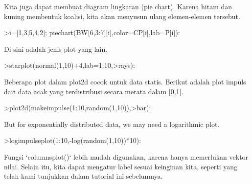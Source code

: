 \documentclass[a4paper,10pt]{article}
\begin{document}
\begin{eulernotebook}
\begin{eulercomment}
Kita juga dapat membuat diagram lingkaran (pie chart). Karena hitam
dan kuning membentuk koalisi, kita akan menyusun ulang elemen-elemen
tersebut.
\end{eulercomment}
\begin{eulerprompt}
>i=[1,3,5,4,2]; piechart(BW[6,3:7][i],color=CP[i],lab=P[i]):
\end{eulerprompt}
\begin{eulercomment}
Di sini adalah jenis plot yang lain.
\end{eulercomment}
\begin{eulerprompt}
>starplot(normal(1,10)+4,lab=1:10,>rays):
\end{eulerprompt}
\begin{eulercomment}
Beberapa plot dalam plot2d cocok untuk data statis. Berikut adalah
plot impuls dari data acak yang terdistribusi secara merata dalam
[0,1].
\end{eulercomment}
\begin{eulerprompt}
>plot2d(makeimpulse(1:10,random(1,10)),>bar):
\end{eulerprompt}
\begin{eulercomment}
But for exponentially distributed data, we may need a logarithmic plot.
\end{eulercomment}
\begin{eulerprompt}
>logimpulseplot(1:10,-log(random(1,10))*10):
\end{eulerprompt}
\begin{eulercomment}
Fungsi `columnsplot()` lebih mudah digunakan, karena hanya memerlukan
vektor nilai. Selain itu, kita dapat mengatur label sesuai keinginan
kita, seperti yang telah kami tunjukkan dalam tutorial ini sebelumnya.


\end{eulercomment}
\end{eulernotebook}
\end{document}
